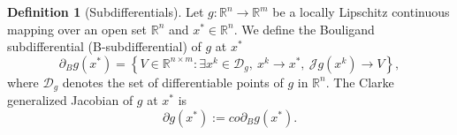 \documentclass[11pt]{article}
\theoremstyle{definition}
\newtheorem{definition}[theorem]{Definition}
\theoremstyle{remark}
\numberwithin{equation}{section}
\begin{document}
\begin{definition}[Subdifferentials]
Let $g: \mathbb{R}^n \rightarrow \mathbb{R}^m$ be a locally Lipschitz continuous mapping  over an open set $\mathbb{R}^n$ and $x^*\in \mathbb{R}^n$.
We define the Bouligand subdifferential (B-subdifferential) of $g$ at $x^*$
\begin{equation*}
  \partial_B g(x^*)=\left\{V\in \mathbb{R}^{n\times m}:\exists x^k\in \mathcal{D}_g, \ x^k\to x^*,\
  \mathcal{J} g(x^k)\to V\right\},
\end{equation*}
where $\mathcal{D}_g$ denotes the set of differentiable points of $g$ in $\mathbb{R}^n$.
The  Clarke generalized Jacobian of $g$ at $x^*$ is
$$ \partial g(x^*):={co} \partial_B g(x^*).$$
\end{definition}
\end{document}
